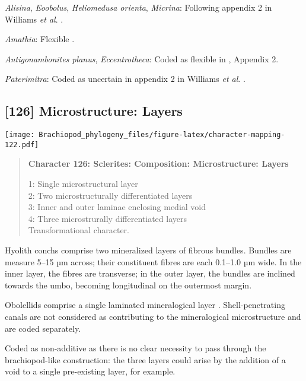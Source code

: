 \documentclass[openany]{book}
\theoremstyle{definition}
\theoremstyle{definition}
\theoremstyle{definition}
\theoremstyle{remark}
\begin{document}
\hypertarget{Alisina-coding-125}{}
\emph{Alisina}, \emph{Eoobolus}, \emph{Heliomedusa orienta},
\emph{Micrina}: Following appendix 2 in Williams \emph{et al}.
\citeyearpar{Williams1998Thediversity}.

\hypertarget{Amathia-coding-125}{}
\emph{Amathia}: Flexible \citep{Williams1998Thediversity}.

\hypertarget{Antigonambonites_planus-coding-125}{}
\emph{Antigonambonites planus}, \emph{Eccentrotheca}: Coded as flexible
in \citet{Williams1998Thediversity}, Appendix 2.

\hypertarget{Paterimitra-coding-125}{}
\emph{Paterimitra}: Coded as uncertain in appendix 2 in Williams
\emph{et al}. \citeyearpar{Williams1998Thediversity}.

\subsection*{{[}126{]} Microstructure:
Layers}\label{microstructure-layers}

\texttt{[image: Brachiopod\_phylogeny\_files/figure-latex/character-mapping-122.pdf]}

\begin{quote}
\textbf{Character 126: Sclerites: Composition: Microstructure: Layers}

1: Single microstructural layer\\
2: Two microstructurally differentiated layers\\
3: Inner and outer laminae enclosing medial void\\
4: Three microstrurally differentiated layers\\
Transformational character.
\end{quote}

Hyolith conchs comprise two mineralized layers of fibrous bundles.
Bundles are measure 5--15 µm across; their constituent fibres are each
0.1--1.0 µm wide. In the inner layer, the fibres are transverse; in the
outer layer, the bundles are inclined towards the umbo, becoming
longitudinal on the outermost margin.

Obolellids comprise a single laminated mineralogical layer
\citep{Balthasar2008iMummpikia}. Shell-penetrating canals are not
considered as contributing to the mineralogical microstructure and are
coded separately.

Coded as non-additive as there is no clear necessity to pass through the
brachiopod-like construction: the three layers could arise by the
addition of a void to a single pre-existing layer, for example.
\end{document}
